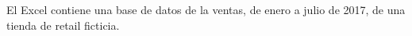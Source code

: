 




 El Excel contiene una base de datos de la ventas, de enero a julio de 2017, de una tienda de retail ficticia. \\





